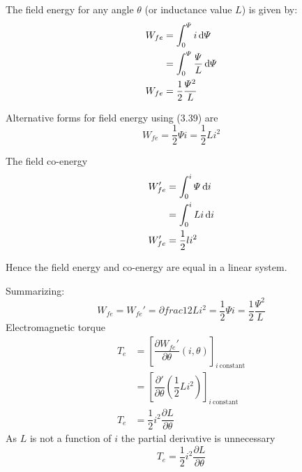 \documentclass[a4paper,numbers=noenddot,12pt]{scrbook}
\begin{document}
            The field energy for any angle $\theta$ (or inductance value $L$) is given by:
            \begin{align*}
                W_{fe} & = \int_0^{\varPsi} i \dif \varPsi \\
                & = \int_0^{\varPsi} \dfrac{\varPsi}{L} \dif \varPsi \\
                W_{fe} & = \dfrac{1}{2} \dfrac{\varPsi^2}{L}
            \end{align*}

            Alternative forms for field energy using (3.39) are
            \begin{equation}
                W_{fe} = \dfrac{1}{2} \varPsi i = \dfrac{1}{2}Li^2
                \label{eq:Eq3.40}
            \end{equation}

            The field co-energy
            \begin{align*}
                W_{fe}' & = \int_0^{i} \varPsi \dif i \\
                & = \int_0^i Li \dif i \\
                W_{fe}' & = \dfrac{1}{2} li^2
            \end{align*}

            Hence the field energy and co-energy are equal in a linear system.

            Summarizing:
            \begin{equation}
                W_{fe} = W_{fe}' = ∂frac{1}{2} L i^2 = \dfrac{1}{2} \varPsi i = \dfrac{1}{2} \dfrac{\varPsi^2}{L}
                \label{eq:Eq3.41}
            \end{equation}
            Electromagnetic torque
            \begin{align*}
                T_e & = {\left[ \dfrac{\partial W_{fe}'}{\partial \theta}(i,\theta)\right]}_{i \  \text{constant}}\\
                & = {\left[ \dfrac{\partial '}{\partial \theta}\left(\dfrac{1}{2} L i^2 \right)\right]}_{i \  \text{constant}} \\
                T_e & = \dfrac{1}{2} i^2 \dfrac{\partial L}{\partial \theta}
            \end{align*}
            As $L$ is not a function of $i$ the partial derivative is unnecessary
            \begin{equation}
                T_e = \dfrac{1}{2} i^2 \dfrac{\partial L}{\partial \theta}
                \label{eq:Eq3.42}
            \end{equation}
\end{document}
